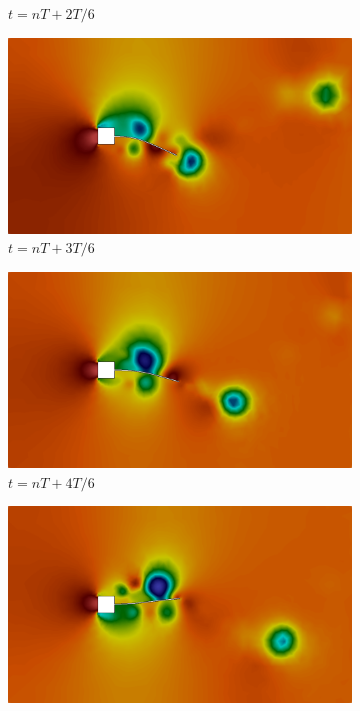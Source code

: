 \begin{figure}[h!]
\begin{subfigure}[b]{0.32\textwidth}
        \caption{$t=nT+2T/6$}
    \end{subfigure}
    \begin{subfigure}[b]{0.32\textwidth}
        \includegraphics[width=\linewidth]{Figuras/FSI-prism2/pT4.png}
        \caption{$t=nT+3T/6$}
    \end{subfigure}
    \begin{subfigure}[b]{0.32\textwidth}
        \includegraphics[width=\linewidth]{Figuras/FSI-prism2/pT5.png}
        \caption{$t=nT+4T/6$}
    \end{subfigure}
    \begin{subfigure}[b]{0.32\textwidth}
        \includegraphics[width=\linewidth]{Figuras/FSI-prism2/pT6.png}

\end{subfigure}
\end{figure}
